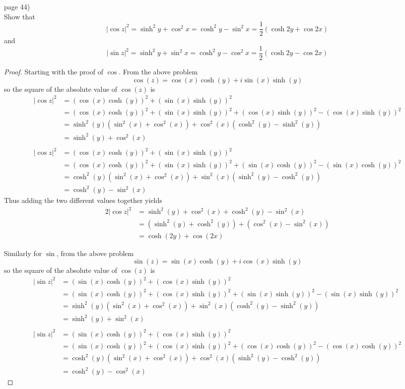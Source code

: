 \documentclass{article}
\newenvironment{problem}[2][Problem]{\begin{trivlist}
\item[\hskip \labelsep {\bfseries #1}\hskip \labelsep {\bfseries #2.}]}{\end{trivlist}}
\begin{document}
\begin{problem}{4} (page 44) \\
  Show that \[
    |\cos z|^2
    = \sinh^2 y + \cos^2 x
    = \cosh^2 y - \sin^2 x
    = \frac{1}{2}(\cosh 2y + \cos 2x)
  \] and \[
    |\sin z|^2
    = \sinh^2 y + \sin^2 x
    = \cosh^2 y - \cos^2 x
    = \frac{1}{2}(\cosh 2y - \cos 2x)
  \]
\end{problem}

\begin{proof}
  Starting with the proof of $\cos$. From the above problem \[
    \cos(z) = \cos(x)\cosh(y) + i\sin(x)\sinh(y)
  \] so the square of the absolute value of $\cos(z)$ is \begin{align*}
    |\cos z|^2 &= (\cos(x)\cosh(y))^2 + (\sin(x)\sinh(y))^2 \\
    &= (\cos(x)\cosh(y))^2 + (\sin(x)\sinh(y))^2 + (\cos(x)\sinh(y))^2 - (\cos(x)\sinh(y))^2\\
    &= \sinh^2(y)(\sin^2(x) + \cos^2(x)) + \cos^2(x)(\cosh^2(y)-\sinh^2(y)) \\
    &= \sinh^2(y) + \cos^2(x)\\
    \\
    |\cos z|^2 &= (\cos(x)\cosh(y))^2 + (\sin(x)\sinh(y))^2 \\
    &= (\cos(x)\cosh(y))^2 + (\sin(x)\sinh(y))^2 + (\sin(x)\cosh(y))^2 - (\sin(x)\cosh(y))^2\\
    &= \cosh^2(y)(\sin^2(x) + \cos^2(x)) + \sin^2(x)(\sinh^2(y)-\cosh^2(y)) \\
    &= \cosh^2(y) - \sin^2(x)
  \end{align*}
  Thus adding the two different values together yields \begin{align*}
    2|\cos z|^2 &= \sinh^2(y) + \cos^2(x) + \cosh^2(y) - \sin^2(x) \\
    &= (\sinh^2(y) + \cosh^2(y)) + (\cos^2(x) - \sin^2(x))\\
    &= \cosh(2y) + \cos(2x)
  \end{align*}

  Similarly for $\sin$, from the above problem \[
    \sin(z) = \sin(x)\cosh(y) + i\cos(x)\sinh(y)
  \] so the square of the absolute value of $\cos(z)$ is \begin{align*}
    |\sin z|^2 &= (\sin(x)\cosh(y))^2 + (\cos(x)\sinh(y))^2 \\
    &= (\sin(x)\cosh(y))^2 + (\cos(x)\sinh(y))^2 + (\sin(x)\sinh(y))^2 - (\sin(x)\sinh(y))^2\\
    &= \sinh^2(y)(\sin^2(x) + \cos^2(x)) + \sin^2(x)(\cosh^2(y)-\sinh^2(y)) \\
    &= \sinh^2(y) + \sin^2(x) \\
    \\
    |\sin z|^2 &= (\sin(x)\cosh(y))^2 + (\cos(x)\sinh(y))^2 \\
    &= (\sin(x)\cosh(y))^2 + (\cos(x)\sinh(y))^2 + (\cos(x)\cosh(y))^2 - (\cos(x)\cosh(y))^2\\
    &= \cosh^2(y)(\sin^2(x) + \cos^2(x)) + \cos^2(x)(\sinh^2(y)-\cosh^2(y)) \\
    &= \cosh^2(y) - \cos^2(x)
  \end{align*}


\end{proof}
\end{document}
